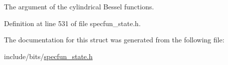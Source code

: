 The argument of the cylindrical Bessel functions. 



Definition at line 531 of file specfun\+\_\+state.\+h.



The documentation for this struct was generated from the following file\+:\begin{DoxyCompactItemize}
\item 
include/bits/\hyperlink{specfun__state_8h}{specfun\+\_\+state.\+h}\end{DoxyCompactItemize}
